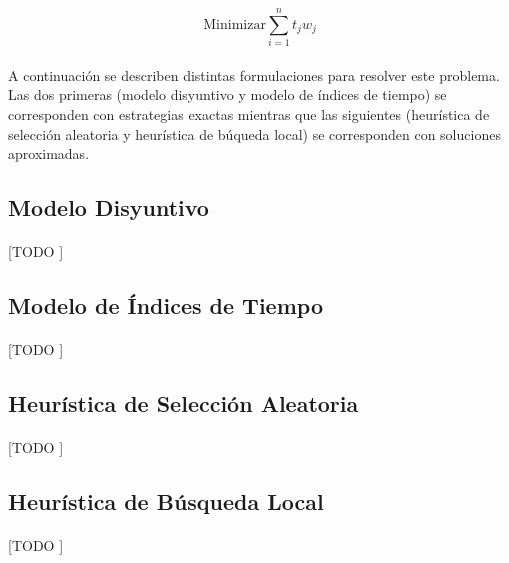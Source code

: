 \documentclass[spanish]{article}
\begin{document}
		\begin{equation}
		\label{eq:min-formula}
			\text{Minimizar} \displaystyle\sum\limits_{i = 1}^{n} t_{j}w_{j}
		\end{equation}

		\paragraph{}
		A continuación se describen distintas formulaciones para resolver este problema. Las dos primeras (modelo disyuntivo y modelo de índices de tiempo) se corresponden con estrategias exactas mientras que las siguientes (heurística de selección aleatoria y heurística de búqueda local) se corresponden con soluciones aproximadas.

		\subsection{Modelo Disyuntivo}
		\label{sec:disyuntive}

			\paragraph{}
			[TODO ]

		\subsection{Modelo de Índices de Tiempo}
		\label{sec:time-index}

			\paragraph{}
			[TODO ]


		\subsection{Heurística de Selección Aleatoria}
		\label{sec:random-heuristic}

			\paragraph{}
			[TODO ]

		\subsection{Heurística de Búsqueda Local}
		\label{sec:local-search-heuristic}

			\paragraph{}
			[TODO ]
\end{document}
